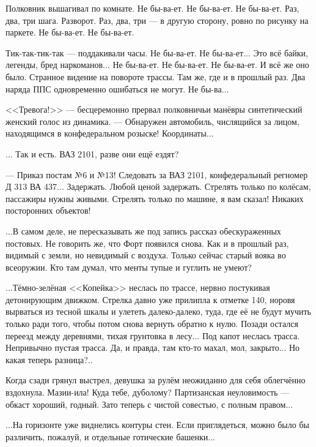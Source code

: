 Полковник вышагивал по комнате. Не бы-ва-ет. Не бы-ва-ет. Не бы-ва-ет.
Раз, два, три шага. Разворот. Раз, два, три --- в другую сторону, ровно по рисунку на паркете. Не бы-ва-ет. Не бы-ва-ет.

Тик-так-тик-так --- поддакивали часы. Не бы-ва-ет. Не бы-ва-ет... Это всё байки, легенды, бред наркоманов...
Не бы-ва-ет. Не бы-ва-ет. Не бы-ва-ет. И всё же оно было.
Странное видение на повороте трассы. Там же, где и в прошлый раз.
Два наряда ППС одновременно ошибаться не могут. Не бы-ва...

<<Тревога!>> --- бесцеремонно прервал полковничьи манёвры синтетический женский голос из динамика.
--- Обнаружен автомобиль, числящийся за лицом, находящимся в конфедеральном розыске! Координаты...

... Так и есть. ВАЗ 2101, разве они ещё ездят?

--- Приказ постам №6 и №13! Следовать за ВАЗ 2101, конфедеральный регномер Д 313 ВА 437...
Задержать. Любой ценой задержать. Стрелять только по колёсам, пассажиры нужны живыми.
Стрелять только по машине, я вам сказал! Никаких посторонних объектов!

...В самом деле, не пересказывать же под запись рассказ обескураженных постовых. Не говорить же, что Форт появился снова.
Как и в прошлый раз, видимый с земли, но невидимый с воздуха. Только сейчас старый вояка во всеоружии.
Кто там думал, что менты тупые и гуглить не умеют?

\emptypar

...Тёмно-зелёная <<Копейка>> неслась по трассе, нервно постукивая детонирующим движком.
Стрелка давно уже прилипла к отметке 140, норовя вырваться из тесной шкалы и улететь далеко-далеко,
туда, где её не будут мучить только ради того, чтобы потом снова вернуть обратно к нулю.
Позади остался переезд между деревнями, тихая грунтовка в лесу...
Под капот неслась трасса. Непривычно пустая трасса. Да, и правда, там кто-то махал, мол, закрыто...
Но какая теперь разница?..

\emptypar

Когда сзади грянул выстрел, девушка за рулём неожиданно для себя облегчённо вздохнула. Мазии-ила! Куда тебе, дуболому?
Партизанская неуловимость --- обкаст хороший, годный. Зато теперь с чистой совестью, с полным правом...

\emptypar

...На горизонте уже виднелись контуры стен.
Если приглядеться, можно было бы различить, пожалуй, и отдельные готические башенки...

